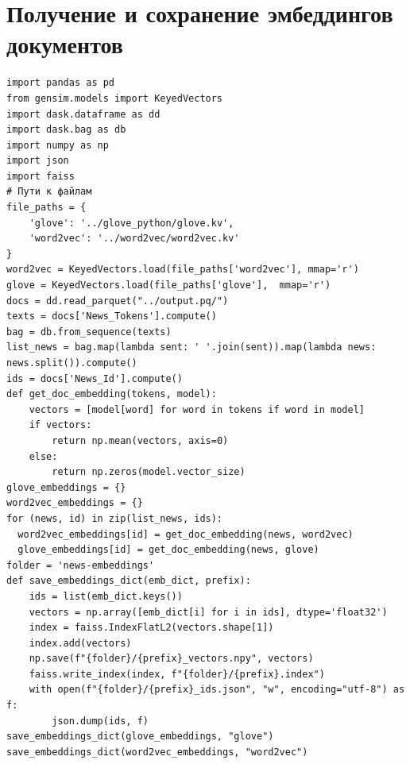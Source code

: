 \documentclass[coursework]{SCWorks}
\begin{document}
\section{Получение и сохранение эмбеддингов документов}
\label{apx:db}
\begin{verbatim}
import pandas as pd
from gensim.models import KeyedVectors
import dask.dataframe as dd
import dask.bag as db
import numpy as np
import json
import faiss
# Пути к файлам
file_paths = {
    'glove': '../glove_python/glove.kv', 
    'word2vec': '../word2vec/word2vec.kv'
}
word2vec = KeyedVectors.load(file_paths['word2vec'], mmap='r')
glove = KeyedVectors.load(file_paths['glove'],  mmap='r')
docs = dd.read_parquet("../output.pq/")
texts = docs['News_Tokens'].compute()
bag = db.from_sequence(texts)
list_news = bag.map(lambda sent: ' '.join(sent)).map(lambda news: news.split()).compute()
ids = docs['News_Id'].compute()
def get_doc_embedding(tokens, model):
    vectors = [model[word] for word in tokens if word in model]
    if vectors:
        return np.mean(vectors, axis=0)
    else:
        return np.zeros(model.vector_size)
glove_embeddings = {}
word2vec_embeddings = {}
for (news, id) in zip(list_news, ids):
  word2vec_embeddings[id] = get_doc_embedding(news, word2vec)
  glove_embeddings[id] = get_doc_embedding(news, glove)
folder = 'news-embeddings'
def save_embeddings_dict(emb_dict, prefix):
    ids = list(emb_dict.keys())
    vectors = np.array([emb_dict[i] for i in ids], dtype='float32')
    index = faiss.IndexFlatL2(vectors.shape[1])
    index.add(vectors)
    np.save(f"{folder}/{prefix}_vectors.npy", vectors)
    faiss.write_index(index, f"{folder}/{prefix}.index")
    with open(f"{folder}/{prefix}_ids.json", "w", encoding="utf-8") as f:
        json.dump(ids, f)
save_embeddings_dict(glove_embeddings, "glove")
save_embeddings_dict(word2vec_embeddings, "word2vec")
\end{verbatim}
\end{document}
